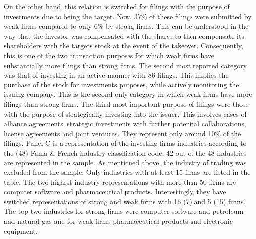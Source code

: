 \documentclass[12pt]{article}
\begin{document}
On the other hand, this relation is switched for filings with the purpose of investments due to being the target. Now, 37\% of these filings were submitted by weak firms compared to only 6\% by strong firms. This can be understood in the way that the investor was compensated with the shares to then compensate its shareholders with the targets stock at the event of the takeover. Consequently, this is one of the two transaction purposes for which weak firms have substantially more filings than strong firms. 
The second most reported category was that of investing in an active manner with 86 filings. This implies the purchase of the stock for investments purposes, while actively monitoring the issuing company. This is the second only category in which weak firms have more filings than strong firms.
The third most important purpose of filings were those with the purpose of strategically investing into the issuer. This involves cases of alliance agreements, strategic investments with further potential collaborations, license agreements and joint ventures. They represent only around 10\% of the filings.
Panel C is a representation of the investing firms industries according to the (48) Fama \& French industry classification code. 42 out of the 48 industries are represented in the sample. As mentioned above, the industry of trading was excluded from the sample. Only industries with at least 15 firms are listed in the table. The two highest industry representations with more than 50 firms are computer software and pharmaceutical products. Interestingly, they have switched representations of strong and weak firms with 16 (7) and 5 (15) firms. The top two industries for strong firms were computer software and petroleum and natural gas and for weak firms pharmaceutical products and electronic equipment. 
\end{document}
